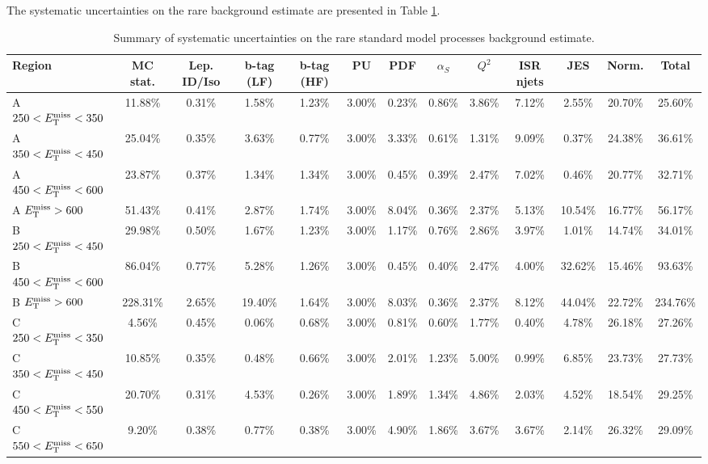 The systematic uncertainties on the rare background estimate are
presented in Table \ref{tab:stop:rarebkg:systematics}.

\begin{table}
\centering
\footnotesize
\caption{Summary of systematic uncertainties on the rare standard
  model processes background estimate.}
\label{tab:stop:rarebkg:systematics}
\begin{tabular}{|l|ccccccccccc|c|}
\hline
Region & MC stat.   &   Lep. ID/Iso   &   b-tag (LF) &   b-tag (HF)  &   PU &   PDF &   $\alpha_S$ &   $Q^2$ &   ISR njets  & JES &   Norm.  & Total \\
\hline
 A $250<E_\text{T}^\text{miss}<350$ & 11.88\% & 0.31\%  & 1.58\%  & 1.23\%  & 3.00\%  & 0.23\%  & 0.86\%  & 3.86\%  & 7.12\%  & 2.55\%  & 20.70\% & 25.60\% \\
 A $350<E_\text{T}^\text{miss}<450$ & 25.04\% & 0.35\%  & 3.63\%  & 0.77\%  & 3.00\%  & 3.33\%  & 0.61\%  & 1.31\%  & 9.09\%  & 0.37\%  & 24.38\% & 36.61\% \\
 A $450<E_\text{T}^\text{miss}<600$ & 23.87\% & 0.37\%  & 1.34\%  & 1.34\%  & 3.00\%  & 0.45\%  & 0.39\%  & 2.47\%  & 7.02\%  & 0.46\%  & 20.77\% & 32.71\% \\
 A $E_\text{T}^\text{miss}>600$     & 51.43\% & 0.41\%  & 2.87\%  & 1.74\%  & 3.00\%  & 8.04\%  & 0.36\%  & 2.37\%  & 5.13\%  & 10.54\% & 16.77\% & 56.17\% \\
 B $250<E_\text{T}^\text{miss}<450$ & 29.98\% & 0.50\%  & 1.67\%  & 1.23\%  & 3.00\%  & 1.17\%  & 0.76\%  & 2.86\%  & 3.97\%  & 1.01\%  & 14.74\% & 34.01\% \\
 B $450<E_\text{T}^\text{miss}<600$ & 86.04\% & 0.77\%  & 5.28\%  & 1.26\%  & 3.00\%  & 0.45\%  & 0.40\%  & 2.47\%  & 4.00\%  & 32.62\% & 15.46\% & 93.63\% \\
 B $E_\text{T}^\text{miss}>600$     & 228.31\%& 2.65\%  & 19.40\% & 1.64\%  & 3.00\%  & 8.03\%  & 0.36\%  & 2.37\%  & 8.12\%  & 44.04\% & 22.72\% & 234.76\%\\
 C $250<E_\text{T}^\text{miss}<350$ & 4.56\%  & 0.45\%  & 0.06\%  & 0.68\%  & 3.00\%  & 0.81\%  & 0.60\%  & 1.77\%  & 0.40\%  & 4.78\%  & 26.18\% & 27.26\% \\
 C $350<E_\text{T}^\text{miss}<450$ & 10.85\% & 0.35\%  & 0.48\%  & 0.66\%  & 3.00\%  & 2.01\%  & 1.23\%  & 5.00\%  & 0.99\%  & 6.85\%  & 23.73\% & 27.73\% \\
 C $450<E_\text{T}^\text{miss}<550$ & 20.70\% & 0.31\%  & 4.53\%  & 0.26\%  & 3.00\%  & 1.89\%  & 1.34\%  & 4.86\%  & 2.03\%  & 4.52\%  & 18.54\% & 29.25\% \\
 C $550<E_\text{T}^\text{miss}<650$ & 9.20\%  & 0.38\%  & 0.77\%  & 0.38\%  & 3.00\%  & 4.90\%  & 1.86\%  & 3.67\%  & 3.67\%  & 2.14\%  & 26.32\% & 29.09\% \\

\end{tabular}
\end{table}
